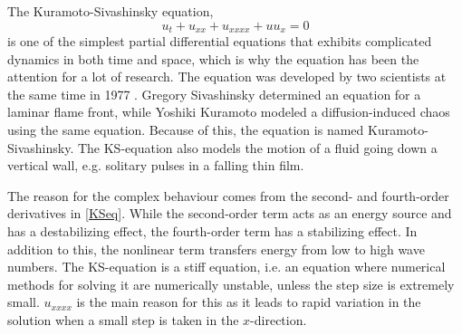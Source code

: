 The Kuramoto-Sivashinsky equation,
\begin{equation}
\label{KSeq}
u_t + u_{xx} + u_{xxxx} + uu_{x} = 0 
\end{equation}
is one of the simplest partial differential equations that exhibits complicated dynamics in both time and space, which is why the equation has been the attention for a lot of research. The equation was developed by two scientists at the same time in 1977 \cite{development}. Gregory Sivashinsky determined an equation for a laminar flame front, while Yoshiki Kuramoto modeled a diffusion-induced chaos using the same equation. Because of this, the equation is named Kuramoto-Sivashinsky. The KS-equation also models the motion of a fluid going down a vertical wall, e.g. solitary pulses in a falling thin film. \cite{trivia}

The reason for the complex behaviour comes from the second- and fourth-order derivatives in \eqref{KSeq}. While the second-order term acts as an energy source and has a destabilizing effect, the fourth-order term has a stabilizing effect. In addition to this, the nonlinear term transfers energy from low to high wave numbers. \cite{stabil} The KS-equation is a stiff equation, i.e. an equation where numerical methods for solving it are numerically unstable, unless the step size is extremely small. $u_{xxxx}$ is the main reason for this as it leads to rapid variation in the solution when a small step is taken in the $x$-direction.







